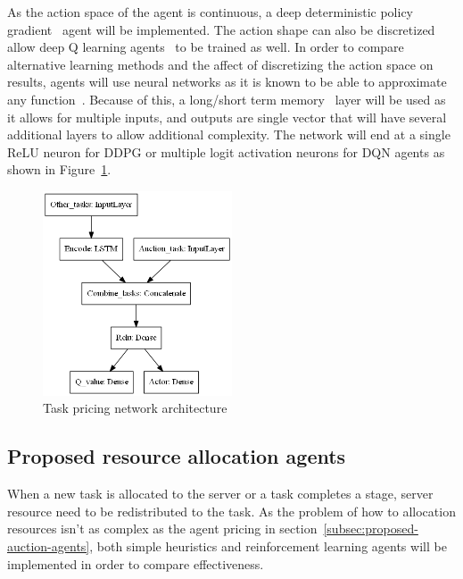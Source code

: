 As the action space of the agent is continuous, a deep deterministic policy gradient~\citep{ddpg} agent
will be implemented. The action shape can also be discretized allow deep Q learning agents~\cite{atari} to be trained
as well. In order to compare alternative learning methods and the affect of discretizing the action space on results,
agents will use neural networks as it is known to be able to approximate any
function~\citep{csaji2001approximation}. Because of this, a long/short term memory~\citep{LSTM} layer will be used as
it allows for multiple inputs, and outputs are single vector that will have several additional layers to allow
additional complexity. The network will end at a single ReLU neuron for DDPG or multiple logit activation neurons for
DQN agents as shown in Figure~\ref{fig:task_pricing_network_architecture}.

\begin{figure}
    \centering
    \includegraphics[width=0.5\textwidth]{figures/2_solution_figs/task_pricing_network_architecture.png}
    \caption{Task pricing network architecture}
    \label{fig:task_pricing_network_architecture}
\end{figure}

\subsection{Proposed resource allocation agents}\label{subsec:proposed-resource-allocation-agents}
When a new task is allocated to the server or a task completes a stage, server resource need to be redistributed
to the task. As the problem of how to allocation resources isn't as complex as the agent pricing in
section~\ref{subsec:proposed-auction-agents}, both simple heuristics and reinforcement learning agents will be
implemented in order to compare effectiveness.

